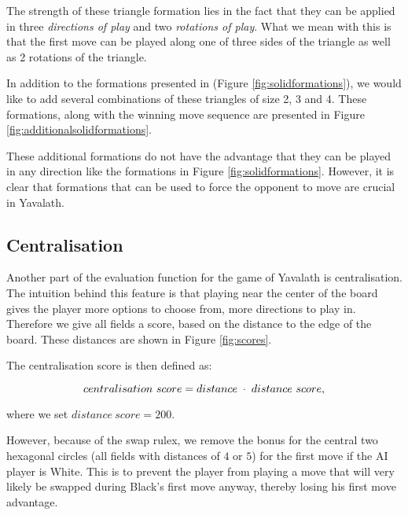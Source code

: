 \documentclass[11pt]{article}
\begin{document}


The strength of these triangle formation lies in the fact that they can be applied in three \emph{directions of play} and two \emph{rotations of play}. What we mean with this is that the first move can be played along one of three sides of the triangle as well as 2 rotations of the triangle.

In addition to the formations presented in \cite{browne2011evolutionary} (Figure \ref{fig:solidformations}), we would like to add several combinations of these triangles of size 2, 3 and 4. These formations, along with the winning move sequence are presented in Figure \ref{fig:additionalsolidformations}.



These additional formations do not have the advantage that they can be played in any direction like the formations in Figure \ref{fig:solidformations}. However, it is clear that formations that can be used to force the opponent to move are crucial in Yavalath.

\subsection{Centralisation}
\label{-subsec:centralisation}
Another part of the evaluation function for the game of Yavalath is centralisation. The intuition behind this feature is that playing near the center of the board gives the player more options to choose from, \ie more directions to play in. Therefore we give all fields a score, based on the distance to the edge of the board. These distances are shown in Figure \ref{fig:scores}. 



The centralisation score is then defined as:

\begin{equation}
	centralisation\ score = distance \;\cdot\; distance\ score,
\end{equation}

where we set $distance\ score = 200$.

However, because of the swap rulex, we remove the bonus for the central two hexagonal circles (all fields with distances of $4$ or $5$) for the first move if the AI player is White. This is to prevent the player from playing a move that will very likely be swapped during Black's first move anyway, thereby losing his first move advantage.
\end{document}
